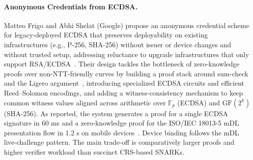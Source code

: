 \paragraph{Anonymous Credentials from ECDSA.}
Matteo Frigo and Abhi Shelat (Google) propose an anonymous credential scheme for legacy-deployed ECDSA that preserves deployability on existing infrastructures (e.g., P-256, SHA-256) without issuer or device changes and without trusted setup, addressing reluctance to upgrade infrastructures that only support RSA/ECDSA~\cite{cryptoeprint:2024/2010}. Their design tackles the bottleneck of zero-knowledge proofs over non-NTT-friendly curves by building a proof stack around sum-check and the Ligero argument~\cite{CCS:AHIV17}, introducing specialized ECDSA circuits and efficient Reed–Solomon encodings, and adding a witness-consistency mechanism to keep common witness values aligned across arithmetic over $\mathbb{F}_{p}$ (ECDSA) and $\mathrm{GF}(2^k)$ (SHA-256). As reported, the system generates a proof for a single ECDSA signature in 60 ms and a zero-knowledge proof for the ISO/IEC 18013-5 mDL presentation flow in 1.2 s on mobile devices~\cite[\S5.3,\S6.2]{cryptoeprint:2024/2010}. Device binding follows the mDL live-challenge pattern. The main trade-off is comparatively larger proofs and higher verifier workload than succinct CRS-based SNARKs.

